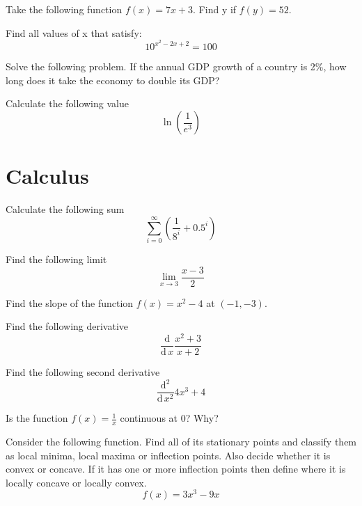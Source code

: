 \documentclass[10pt]{article}
\newenvironment{problem}[2][Problem]{\begin{trivlist}
\item[\hskip \labelsep {\bfseries #1}\hskip \labelsep {\bfseries #2.}]}{\end{trivlist}}
\begin{document}
\begin{problem}{2.2}
Take the following function $f(x)=7x+3$. Find y if $f(y)=52$.
\end{problem}

\begin{problem}{2.3}
Find all values of x that satisfy:
$$10^{x^2-2x+2}=100$$
\end{problem}

\begin{problem}{2.4}
Solve the following problem. If the annual GDP growth of a country is 2\%, how long does it take the economy to double its GDP?
\end{problem}

\begin{problem}{2.5}
Calculate the following value
$$\ln\left(\frac{1}{e^3} \right)$$
\end{problem}

\section{Calculus}

\begin{problem}{3.1}
Calculate the following sum
$$\sum\limits_{i=0}^{\infty} \left( \frac{1}{8^i}+0.5^i\right)$$
\end{problem}

\begin{problem}{3.2}
Find the following limit
$$\lim\limits_{x \rightarrow 3}\frac{x-3}{2}$$
\end{problem}

\begin{problem}{3.3}
Find the slope of the function $f(x)=x^2-4$ at $(-1,-3)$.
\end{problem}

\begin{problem}{3.4}
Find the following derivative
$$\frac{\mathrm{d}}{\mathrm{d}\, x} \frac{x^2+3}{x+2}$$
\end{problem}

\begin{problem}{3.5}
Find the following second derivative
 $$\frac{\mathrm{d^2}}{\mathrm{d}\, x^2} 4x^3+4$$
\end{problem}

\begin{problem}{3.6}
Is the function  $f(x)=\frac{1}{x}$ continuous at $0$? Why?
\end{problem}

\begin{problem}{3.7}
Consider the following function. Find all of its stationary points and classify them as local minima, local maxima or inflection points. Also decide whether it is convex or concave. If it has one or more inflection points then define where it is locally concave or locally convex.
$$f(x)=3x^3-9x$$
\end{problem}
\end{document}
